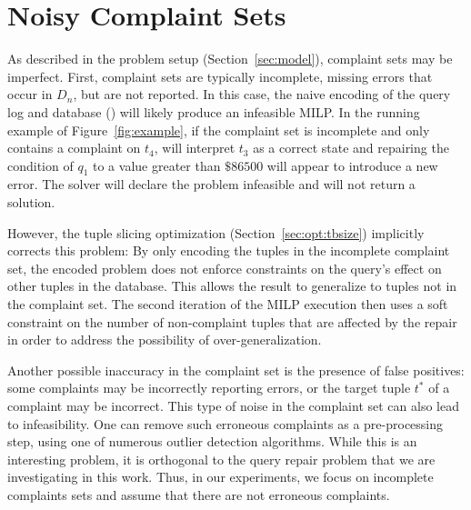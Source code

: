 
\section{Noisy Complaint Sets}
\label{sec:noise}

As described in the problem setup (Section~\ref{sec:model}), complaint
sets may be imperfect. First, complaint sets are typically incomplete,
missing errors that occur in $D_n$, but are not reported. In this
case, the naive encoding of the query log and database (\naive) will
likely produce an infeasible MILP. In the running example of
Figure~\ref{fig:example}, if the complaint set is incomplete and only
contains a complaint on $t_4$, \naive will interpret $t_3$ as a
correct state and repairing the condition of $q_1$ to a value greater
than $\$86500$ will appear to introduce a new error. The solver will
declare the problem infeasible and will not return a solution.



However, the tuple slicing optimization (Section~\ref{sec:opt:tbsize})
implicitly corrects this problem: By only encoding the tuples in the
incomplete complaint set, the encoded problem does not enforce
constraints on the query's effect on other tuples in the database.
This allows the result to generalize to tuples not in the complaint
set. The second iteration of the MILP execution then uses a soft
constraint on the number of non-complaint tuples that are affected by
the repair in order to address the possibility of over-generalization.

Another possible inaccuracy in the complaint set is the presence of
false positives: some complaints may be incorrectly reporting errors,
or the target tuple $t^*$ of a complaint may be incorrect. This type
of noise in the complaint set can also lead to infeasibility. One can
remove such erroneous complaints as a pre-processing step, using one
of numerous outlier detection algorithms. While this is an
interesting problem, it is orthogonal to the query repair problem that
we are investigating in this work. Thus, in our experiments, we focus
on incomplete complaints sets and assume that there are not erroneous
complaints.


